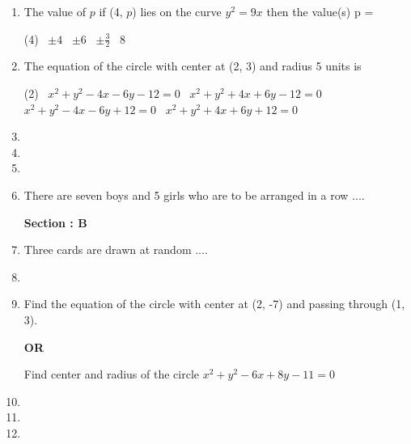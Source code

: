 \documentclass[12pt,a4paper]{article}
\begin{document}

\begin {enumerate}

\item The value of $p$ if (4, $p$) lies on the curve $y^2 = 9x$ then the value(s) p =  

\begin{tasks}(4)
\task\ $\pm 4$
\task\ $\pm 6$
\task\ $\pm \frac{3}{2} $
\task\ $ 8$
\end{tasks}

\item The equation of the circle with center at (2, 3) and radius 5 units is 

\begin{tasks}(2)
\task\ $x^2+y^2-4x-6y-12=0$
\task\ $x^2+y^2+4x+6y-12=0$
\task\ $x^2+y^2-4x-6y+12=0$
\task\ $x^2+y^2+4x+6y+12=0$
\end{tasks}

\item

\item

\item

\item There are seven boys and 5 girls who are to be arranged in a row ....



\begin{center}

\textbf {Section : B}

\end{center}

\item Three cards are drawn at random ....

\item

\item Find the equation of the circle with center at (2, -7) and passing through (1, 3). 

\begin{center}
\textbf {OR}
\end{center}
Find center and radius of the circle $ x^2 + y^2 -6x + 8y - 11 = 0$

\item

\item

\item


\end{enumerate}
\end{document}
